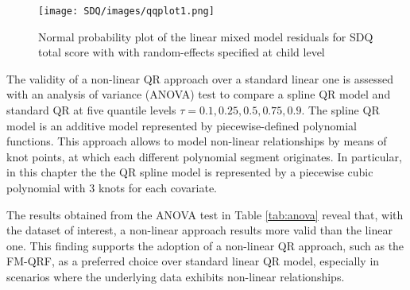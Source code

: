 \begin{figure}[H]
    \centering
\texttt{[image: SDQ/images/qqplot1.png]}
    \caption{Normal probability plot of the linear mixed model residuals for SDQ total score with  with random-effects specified at child level}
    \label{fig:qqplot}
\end{figure}

\vspace{0.15in}

\noindent The validity of a non-linear QR approach over a standard linear one is assessed with an analysis of variance (ANOVA) test \citep{st1989analysis} to compare a spline QR model and standard QR at five quantile levels $\tau=0.1, 0.25, 0.5, 0.75, 0.9$. 
The spline QR model is an additive model represented by piecewise-defined polynomial functions. This approach allows to model non-linear relationships by means of knot points, at which each different polynomial segment originates. In particular, in this chapter the the QR spline model is represented by
a piecewise cubic polynomial with 3 knots for each covariate.

\vspace{0.15in}

\noindent The results obtained from the ANOVA test in Table \ref{tab:anova} reveal that, with the dataset of interest, a non-linear approach results more valid than the linear one. This finding supports the adoption of a non-linear QR approach, such as the FM-QRF, as a preferred choice over standard linear QR model, especially in scenarios where the underlying data exhibits non-linear relationships.






